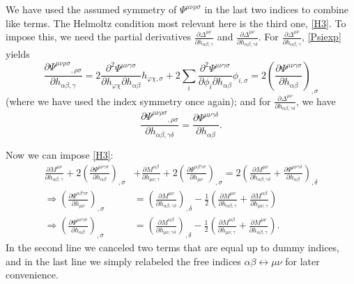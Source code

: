 \documentclass[aps,physrev,preprint,groupedaddress]{revtex4-2}
\begin{document}
We have used the assumed symmetry of  \(\Psi^{\mu\nu\rho\sigma}\) in the last two indices to combine like terms. The Helmoltz condition most relevant here is the third one, \eqref{H3}. To impose this, we need the partial derivatives \(\frac{\partial\Delta^{\mu\nu}}{\partial h_{\alpha\beta,\gamma}}\) and \(\frac{\partial\Delta^{\mu\nu}}{\partial h_{\alpha\beta,\gamma\delta}}\). For \(\frac{\partial\Delta^{\mu\nu}}{\partial h_{\alpha\beta,\gamma}}\), \eqref{Psiexp} yields
\begin{equation}\label{dDelddh}
 \frac{\partial \Psi^{\mu\nu\rho\sigma}{}_{,\rho\sigma}}{\partial h_{\alpha\beta,\gamma}}=2\frac{\partial^2 \Psi^{\mu\nu\gamma\sigma}}{\partial h_{\varphi\chi}\partial h_{\alpha\beta}}h_{\varphi\chi,\sigma}+2\sum_i\frac{\partial^2 \Psi^{\mu\nu\gamma\sigma}}{\partial \phi_i\partial h_{\alpha\beta}}\phi_{i,\sigma}=2{\left(\frac{\partial \Psi^{\mu\nu\gamma\sigma}}{\partial h_{\alpha\beta}}\right)}_{,\sigma}  
\end{equation}
(where we have used the index symmetry once again); and for \(\frac{\partial\Delta^{\mu\nu}}{\partial h_{\alpha\beta,\gamma\delta}}\), we have 
\begin{equation}
\frac{\partial  \Psi^{\mu\nu\rho\sigma}{}_{,\rho\sigma}}{\partial h_{\alpha\beta,\gamma\delta}}=\frac{\partial \Psi^{\mu\nu\gamma\delta}}{\partial h_{\alpha\beta}}. 
\end{equation}

Now we can impose \eqref{H3}:
\begin{equation}\label{H3forDel}\begin{split}
 \frac{\partial M^{\mu\nu}}{\partial h_{\alpha\beta,\gamma}}+2{\left(\frac{\partial \Psi^{\mu\nu\gamma\sigma}}{\partial h_{\alpha\beta}}\right)}_{,\sigma}&+\frac{\partial M^{\alpha\beta}}{\partial h_{\mu\nu,\gamma}}+2{\left(\frac{\partial \Psi^{\alpha\beta\gamma\sigma}}{\partial h_{\mu\nu}}\right)}_{,\sigma}=2{\left(\frac{\partial M^{\mu\nu}}{\partial h_{\alpha\beta,\gamma\delta}}+\frac{\partial \Psi^{\mu\nu\gamma\delta}}{\partial h_{\alpha\beta}}\right)}_{,\delta}\\ \Rightarrow{\left(\frac{\partial \Psi^{\alpha\beta\gamma\sigma}}{\partial h_{\mu\nu}}\right)}_{,\sigma}&={\left(\frac{\partial M^{\mu\nu}}{\partial h_{\alpha\beta,\gamma\delta}}\right)}_{,\delta}-\frac{1}{2}\left(\frac{\partial M^{\mu\nu}}{\partial h_{\alpha\beta,\gamma}}+\frac{\partial M^{\alpha\beta}}{\partial h_{\mu\nu,\gamma}}\right)
 \\ \Rightarrow{\left(\frac{\partial \Psi^{\mu\nu\gamma\sigma}}{\partial h_{\alpha\beta}}\right)}_{,\sigma}&={\left(\frac{\partial M^{\alpha\beta}}{\partial h_{\mu\nu,\gamma\delta}}\right)}_{,\delta}-\frac{1}{2}\left(\frac{\partial M^{\alpha\beta}}{\partial h_{\mu\nu,\gamma}}+\frac{\partial M^{\mu\nu}}{\partial h_{\alpha\beta,\gamma}}\right).\end{split}\end{equation}
In the second line we canceled two terms that are equal up to dummy indices, and in the last line we simply relabeled the free indices \(\alpha\beta\leftrightarrow\mu\nu\) for later convenience.
\end{document}
